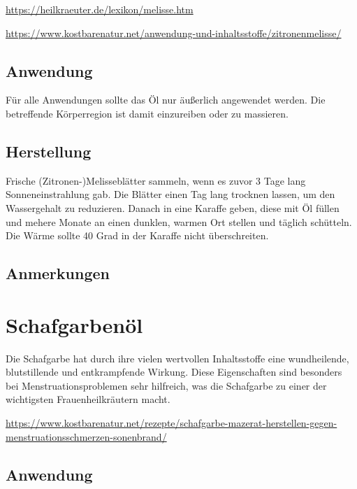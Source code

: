 \cite{heilkraeuterlexikon} 

\url{https://heilkraeuter.de/lexikon/melisse.htm} 

\url{https://www.kostbarenatur.net/anwendung-und-inhaltsstoffe/zitronenmelisse/}

 

\subsection{Anwendung}

Für alle Anwendungen sollte das Öl nur äußerlich angewendet werden. Die betreffende Körperregion ist damit einzureiben oder zu massieren.

\subsection{Herstellung}

Frische (Zitronen-)Melisseblätter sammeln, wenn es zuvor 3 Tage lang Sonneneinstrahlung gab. Die Blätter einen Tag lang trocknen lassen, um den Wassergehalt zu reduzieren. Danach in eine Karaffe geben, diese mit Öl füllen und mehere Monate an einen dunklen, warmen Ort stellen und täglich schütteln. Die Wärme sollte 40 Grad in der Karaffe nicht überschreiten.


\subsection{Anmerkungen}







\section{Schafgarbenöl}

Die Schafgarbe hat durch ihre vielen wertvollen Inhaltsstoffe eine wundheilende, blutstillende und entkrampfende Wirkung. Diese Eigenschaften sind besonders bei Menstruationsproblemen sehr hilfreich, was die Schafgarbe zu einer der wichtigsten Frauenheilkräutern macht.


\url{https://www.kostbarenatur.net/rezepte/schafgarbe-mazerat-herstellen-gegen-menstruationsschmerzen-sonenbrand/}

   


\subsection{Anwendung}

